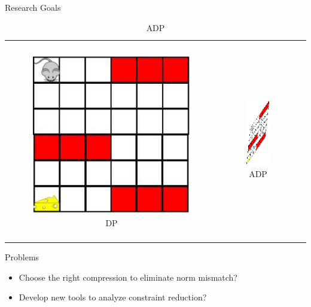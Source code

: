 \documentclass[10pt,handout]{beamer}
\begin{document}
\begin{frame}[fragile]{Research Goals}
\begin{table}
\begin{tabular}{ccc}

\begin{minipage}{0.3\textwidth}
\begin{figure}
\includegraphics[scale=0.2]{mouse-single.png}
\caption*{DP}
\end{figure}
\end{minipage}
&
\begin{minipage}{0.3\textwidth}
\begin{figure}
\includegraphics[scale=0.2]{compress-mouse.png}
\caption*{ADP}
\end{figure}
\end{minipage}
&
\begin{minipage}{0.3\textwidth}
{\color{orange}{$\norm{J^*-\tj}_\infty$?}}\\
\end{minipage}
\end{tabular}
\end{table}
\begin{block}{Problems}
\begin{itemize}
\item Choose the right compression to eliminate norm mismatch?
\item Develop new tools to analyze constraint reduction?
\end{itemize}
\end{block}
\end{frame}
\end{document}
